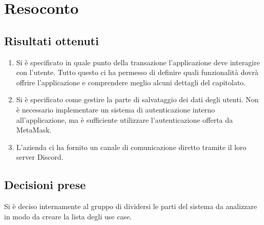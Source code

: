 \section{Resoconto}

\subsection{Risultati ottenuti}
\begin{enumerate}
    \item Si è specificato in quale punto della transazione l'applicazione deve interagire con l'utente. Tutto questo ci ha permesso di definire quali funzionalità dovrà offrire l'applicazione e comprendere meglio alcuni dettagli del capitolato.
    \item Si è specificato come gestire la parte di salvataggio dei dati degli utenti. Non è necessario implementare un sistema di autenticazione interno all'applicazione, ma è sufficiente utilizzare l'autenticazione offerta da MetaMask.
    \item L'azienda ci ha fornito un canale di comunicazione diretto tramite il loro server Discord.
\end{enumerate}

\subsection{Decisioni prese}
Si è deciso internamente al gruppo di dividersi le parti del sistema da analizzare in modo da creare la lista degli use case.